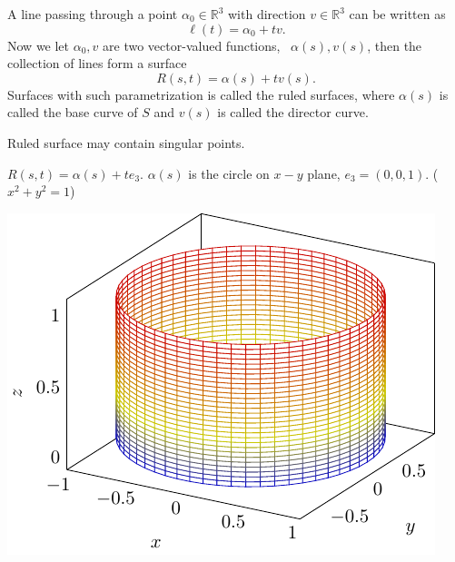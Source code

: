 \begin{exercise}
    A line passing through a point \(\alpha_0\in\mathbb{R}^3\) 
    with direction \(v\in \mathbb{R}^3\) can be written as 
    \[
        \ell(t)=\alpha_0 + t v.    
    \]
    Now we let \(\alpha_0,v\) are two vector-valued functions,
    \ie\ \(\alpha(s),v(s)\), then the collection of lines form 
    a surface 
    \[
        R(s,t)=\alpha(s)+t v(s).    
    \]
Surfaces with such parametrization is called the ruled surfaces, 
where \(\alpha(s)\) is called the base curve of \(S\) and 
\(v(s)\) is called the director curve.
\end{exercise}
\begin{remark}
    Ruled surface may contain singular points.
\end{remark}
\begin{example}
    \(R(s,t)=\alpha(s)+t e_3\). \(\alpha(s)\) is the circle on \(x-y\)
    plane, \(e_3=(0,0,1)\). (\(x^2+y^2=1\)) 
    \begin{center}
        \includegraphics{picture/week9/ruled surface-cylinder.pdf}

        \end{center}
\end{example}
